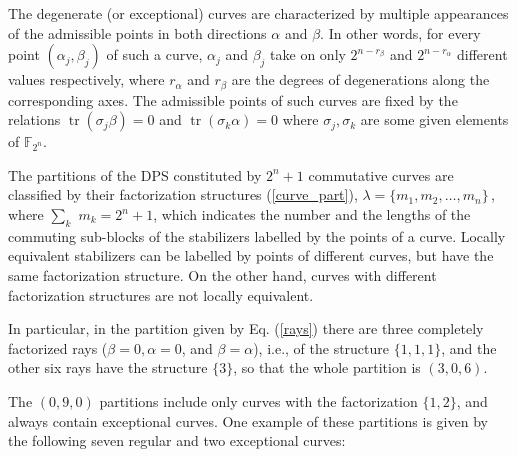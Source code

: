 \documentclass[quantumrep,article,submit,pdftex,moreauthors]{Definitions/mdpi}
\DeclareMathOperator{\tr}{tr}
\begin{document}
The degenerate (or exceptional) curves are characterized by multiple appearances
of the admissible points in both directions $\alpha $ and $\beta$. In other
words, for every point $(\alpha_{j},\beta_{j})$ of such a curve, $\alpha_{j}$
and $\beta_{j}$ take on only $2^{n-r_{\beta}}$ and $2^{n-r_{\alpha}}$ different
values respectively, where $r_{\alpha}$ and $r_{\beta}$ are the degrees of
degenerations along the corresponding axes.  The admissible points of such
curves are fixed by the relations $\tr(\sigma_{j}\beta)=0$ and
$\tr(\sigma_{k}\alpha)=0$ where $\sigma_{j}, \sigma_{k}$ are some given elements
of $\mathbb{F}_{2^{n}}$.

The partitions of the DPS constituted by $2^{n}+1$ commutative curves are
classified by their factorization structures (\ref{curve_part}),
$\lambda=\{m_{1},m_{2},\ldots,m_{n}\}\,$, where $\sum_{k}$ $m_{k}=2^{n}+1$,
which indicates the number and the lengths of the commuting sub-blocks of the
stabilizers labelled by the points of a curve. Locally equivalent stabilizers
can be labelled by points of different curves, but have the same factorization
structure. On the other hand, curves with different factorization structures are
not locally equivalent.

In particular, in the partition given by Eq. (\ref{rays}) there are three
completely factorized rays ($\beta = 0, \alpha = 0$, and $\beta = \alpha$),
i.e., of the structure $\{1,1,1\}$, and the other six rays have the structure
$\{3\}$, so that the whole partition is $(3,0,6)$.

The $(0,9,0)$ partitions include only curves with the factorization $\{1,2\}$,
and always contain exceptional curves. One example of these partitions is given
by the following seven regular and two exceptional curves:
\end{document}
